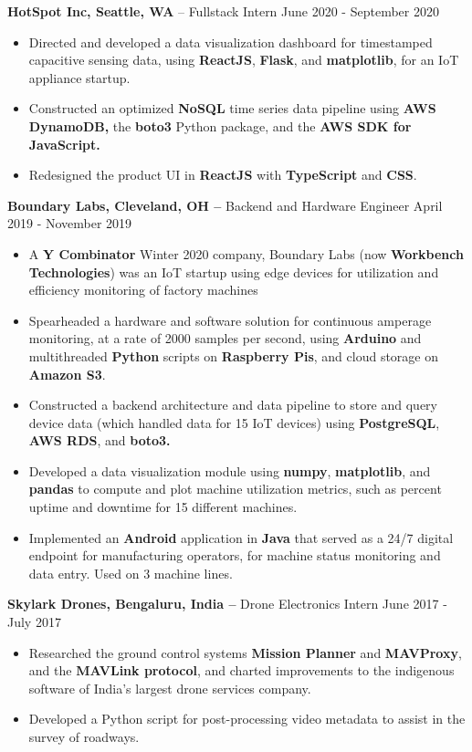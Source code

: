 \documentclass{res}
\begin{document}
\begin{resume}
 {\large{\bf HotSpot Inc, Seattle, WA} – Fullstack Intern   \hfill June 2020 - September 2020}
 \begin{itemize} \itemsep -2pt  %
 \item Directed and developed a data visualization dashboard for timestamped capacitive sensing data, using \textbf{ReactJS}, \textbf{Flask}, and \textbf{matplotlib}, for an IoT appliance startup.
 \item Constructed an optimized \textbf{NoSQL} time series data pipeline using \textbf{AWS DynamoDB,} the \textbf{boto3} Python package, and the \textbf{AWS SDK for JavaScript.}
 \item Redesigned the product UI in \textbf{ReactJS} with \textbf{TypeScript} and \textbf{CSS}.
 \end{itemize}

 {\large{\bf Boundary Labs, Cleveland, OH –} Backend and Hardware Engineer   \hfill April  2019 - November 2019 }
 \begin{itemize} \itemsep -2pt  %
 \item A \textbf{Y Combinator} Winter 2020 company, Boundary Labs (now \textbf{Workbench Technologies}) was an IoT startup using edge devices for utilization and efficiency monitoring of factory machines 
 \item Spearheaded a hardware and software solution for continuous amperage monitoring, at a rate of 2000 samples per second, using \textbf{Arduino} and multithreaded \textbf{Python} scripts on \textbf{Raspberry Pis}, and cloud storage on \textbf{Amazon S3}.
 \item Constructed a backend architecture and data pipeline to store and query device data (which  handled data for 15 IoT devices) using \textbf{PostgreSQL}, \textbf{AWS RDS}, and  \textbf{boto3.} 
 \item Developed a data visualization module using \textbf{numpy}, \textbf{matplotlib}, and \textbf{pandas} to compute and plot machine utilization metrics, such as percent uptime and downtime for 15 different machines.
 \item Implemented an \textbf{Android} application in \textbf{Java} that served as a 24/7 digital endpoint for manufacturing operators, for machine status monitoring and data entry. Used on 3 machine lines.
 \end{itemize}

{\large{\bf Skylark Drones, Bengaluru, India –} Drone Electronics Intern  \hfill  June 2017 - July 2017}
\begin{itemize} \itemsep -2pt %
	\item Researched  the ground control systems \textbf{Mission Planner} and \textbf{MAVProxy}, and the \textbf{MAVLink protocol}, and charted improvements to the indigenous software of India's largest drone services company.
	\item Developed a Python script for post-processing video metadata to assist in the survey of roadways.
\end{itemize}


\end{resume}
\end{document}

